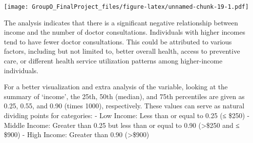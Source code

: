 \documentclass[
]{article}
\newenvironment{Shaded}{\begin{snugshade}}{\end{snugshade}}
\newcommand{\AttributeTok}[1]{\textcolor[rgb]{0.13,0.29,0.53}{#1}}
\newcommand{\CommentTok}[1]{\textcolor[rgb]{0.56,0.35,0.01}{\textit{#1}}}
\newcommand{\FloatTok}[1]{\textcolor[rgb]{0.00,0.00,0.81}{#1}}
\newcommand{\FunctionTok}[1]{\textcolor[rgb]{0.13,0.29,0.53}{\textbf{#1}}}
\newcommand{\NormalTok}[1]{#1}
\newcommand{\OtherTok}[1]{\textcolor[rgb]{0.56,0.35,0.01}{#1}}
\newcommand{\SpecialCharTok}[1]{\textcolor[rgb]{0.81,0.36,0.00}{\textbf{#1}}}
\newcommand{\StringTok}[1]{\textcolor[rgb]{0.31,0.60,0.02}{#1}}
\begin{document}
\texttt{[image: GroupO\_FinalProject\_files/figure-latex/unnamed-chunk-19-1.pdf]}

The analysis indicates that there is a significant negative relationship
between income and the number of doctor consultations. Individuals with
higher incomes tend to have fewer doctor consultations. This could be
attributed to various factors, including but not limited to, better
overall health, access to preventive care, or different health service
utilization patterns among higher-income individuals.

For a better visualization and extra analysis of the variable, looking
at the summary of `income', the 25th, 50th (median), and 75th
percentiles are given as 0.25, 0.55, and 0.90 (times 1000),
respectively. These values can serve as natural dividing points for
categories: - Low Income: Less than or equal to 0.25 (≤ \$250) - Middle
Income: Greater than 0.25 but less than or equal to 0.90
(\textgreater\$250 and ≤ \$900) - High Income: Greater than 0.90
(\textgreater\$900)

\begin{Shaded}
\end{Shaded}
\end{document}
